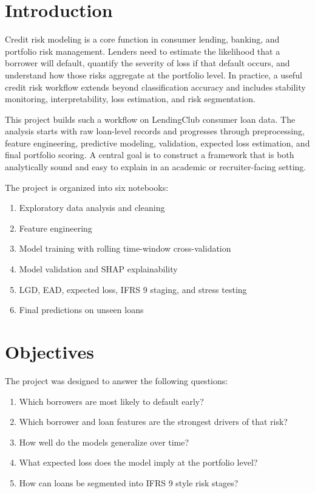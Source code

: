 \documentclass[12pt]{article}
\begin{document}
\section{Introduction}

Credit risk modeling is a core function in consumer lending, banking, and portfolio risk management. Lenders need to estimate the likelihood that a borrower will default, quantify the severity of loss if that default occurs, and understand how those risks aggregate at the portfolio level. In practice, a useful credit risk workflow extends beyond classification accuracy and includes stability monitoring, interpretability, loss estimation, and risk segmentation.

This project builds such a workflow on LendingClub consumer loan data. The analysis starts with raw loan-level records and progresses through preprocessing, feature engineering, predictive modeling, validation, expected loss estimation, and final portfolio scoring. A central goal is to construct a framework that is both analytically sound and easy to explain in an academic or recruiter-facing setting.

The project is organized into six notebooks:

\begin{enumerate}[leftmargin=1.5em]
    \item Exploratory data analysis and cleaning
    \item Feature engineering
    \item Model training with rolling time-window cross-validation
    \item Model validation and SHAP explainability
    \item LGD, EAD, expected loss, IFRS 9 staging, and stress testing
    \item Final predictions on unseen loans
\end{enumerate}

\section{Objectives}

The project was designed to answer the following questions:

\begin{enumerate}[leftmargin=1.5em]
    \item Which borrowers are most likely to default early?
    \item Which borrower and loan features are the strongest drivers of that risk?
    \item How well do the models generalize over time?
    \item What expected loss does the model imply at the portfolio level?
    \item How can loans be segmented into IFRS 9 style risk stages?
\end{enumerate}
\end{document}
